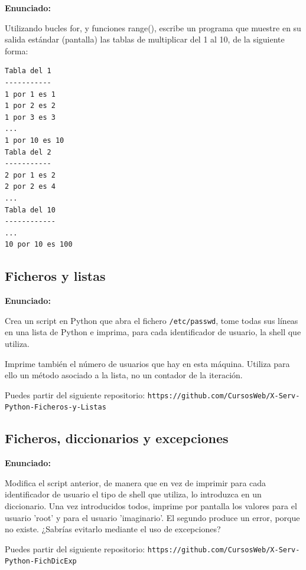 \textbf{Enunciado:}

Utilizando bucles for, y funciones range(), escribe un programa que muestre en su salida estándar (pantalla) las tablas de multiplicar del 1 al 10, de la siguiente forma:

\begin{verbatim}
Tabla del 1
-----------
1 por 1 es 1
1 por 2 es 2
1 por 3 es 3
...
1 por 10 es 10
Tabla del 2
-----------
2 por 1 es 2
2 por 2 es 4
...
Tabla del 10
------------
...
10 por 10 es 100
\end{verbatim}

\subsection{Ficheros y listas}
\label{subsec:ficheros-listas}

\textbf{Enunciado:}

Crea un script en Python que abra el fichero \verb|/etc/passwd|, tome todas sus líneas en una lista de Python e imprima, para cada identificador de usuario, la shell que utiliza.

Imprime también el número de usuarios que hay en esta máquina. Utiliza para
ello un método asociado a la lista, no un contador de la iteración.

Puedes partir del siguiente repositorio: \verb|https://github.com/CursosWeb/X-Serv-Python-Ficheros-y-Listas|

\subsection{Ficheros, diccionarios y excepciones}
\label{subsec:ficheros-dic-excep}

\textbf{Enunciado:}

Modifica el script
anterior, de manera que en vez de imprimir para cada identificador de usuario el tipo
de shell que utiliza, lo introduzca en un diccionario. Una vez introducidos todos, imprime por pantalla los valores para el usuario 'root' y para el
usuario 'imaginario'. El segundo produce un error, porque no existe. ¿Sabrías evitarlo mediante el uso de
excepciones?

Puedes partir del siguiente repositorio: \verb|https://github.com/CursosWeb/X-Serv-Python-FichDicExp|

